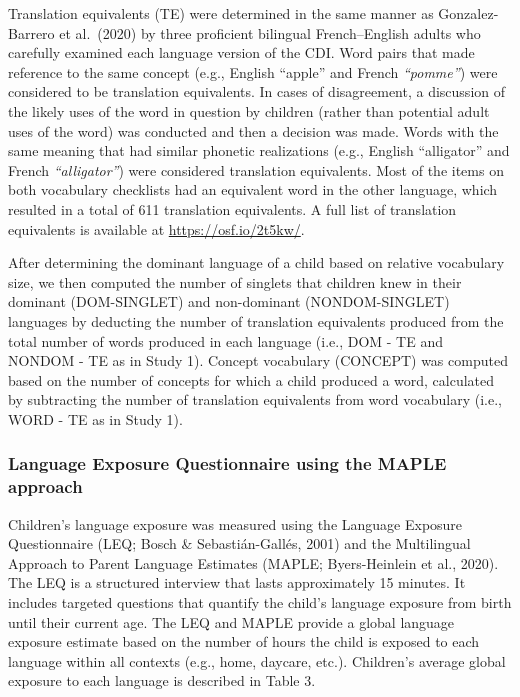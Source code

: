 \documentclass[
  english,
  ,man,floatsintext]{apa6}
\begin{document}
Translation equivalents (TE) were determined in the same manner as Gonzalez-Barrero et al.~(2020) by three proficient bilingual French--English adults who carefully examined each language version of the CDI. Word pairs that made reference to the same concept (e.g., English ``apple'' and French \emph{``pomme''}) were considered to be translation equivalents. In cases of disagreement, a discussion of the likely uses of the word in question by children (rather than potential adult uses of the word) was conducted and then a decision was made. Words with the same meaning that had similar phonetic realizations (e.g., English ``alligator'' and French \emph{``alligator''}) were considered translation equivalents. Most of the items on both vocabulary checklists had an equivalent word in the other language, which resulted in a total of 611 translation equivalents. A full list of translation equivalents is available at \url{https://osf.io/2t5kw/}.

After determining the dominant language of a child based on relative vocabulary size, we then computed the number of singlets that children knew in their dominant (DOM-SINGLET) and non-dominant (NONDOM-SINGLET) languages by deducting the number of translation equivalents produced from the total number of words produced in each language (i.e., DOM - TE and NONDOM - TE as in Study 1). Concept vocabulary (CONCEPT) was computed based on the number of concepts for which a child produced a word, calculated by subtracting the number of translation equivalents from word vocabulary (i.e., WORD - TE as in Study 1).

\hypertarget{language-exposure-questionnaire-using-the-maple-approach}{%
\subsubsection{Language Exposure Questionnaire using the MAPLE approach}\label{language-exposure-questionnaire-using-the-maple-approach}}

Children's language exposure was measured using the Language Exposure Questionnaire (LEQ; Bosch \& Sebastián-Gallés, 2001) and the Multilingual Approach to Parent Language Estimates (MAPLE; Byers-Heinlein et al., 2020). The LEQ is a structured interview that lasts approximately 15 minutes. It includes targeted questions that quantify the child's language exposure from birth until their current age. The LEQ and MAPLE provide a global language exposure estimate based on the number of hours the child is exposed to each language within all contexts (e.g., home, daycare, etc.). Children's average global exposure to each language is described in Table 3.
\end{document}
